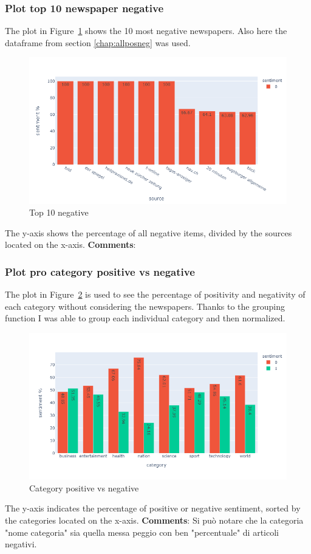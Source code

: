 \subsubsection{Plot top 10 newspaper negative}
The plot in Figure~\ref{fig:fig_10neg} shows the 10 most negative newspapers. Also here the dataframe from section \ref{chap:allposneg} was used.
\begin{figure}[H]
\centering
\includegraphics[width=1\textwidth]{images/output_86_0.png}
\caption{Top 10 negative}
\label{fig:fig_10neg}
\end{figure}
\FloatBarrier
The y-axis shows the percentage of all negative items, divided by the sources located on the x-axis.
\textbf{Comments}:


\subsubsection{Plot pro category positive vs negative}
The plot in Figure~\ref{fig:fig_catposneg} is used to see the percentage of positivity and negativity of each category without considering the newspapers. Thanks to the grouping function I was able to group each individual category and then normalized.

\begin{figure}[H]
\centering
\includegraphics[width=1\textwidth]{images/output_91_0.png}
\caption{Category positive vs negative}
\label{fig:fig_catposneg}
\end{figure}
\FloatBarrier
The y-axis indicates the percentage of positive or negative sentiment, sorted by the categories located on the x-axis.
\textbf{Comments}: Si può notare che la categoria "nome categoria" sia quella messa peggio con ben "percentuale" di articoli negativi.

